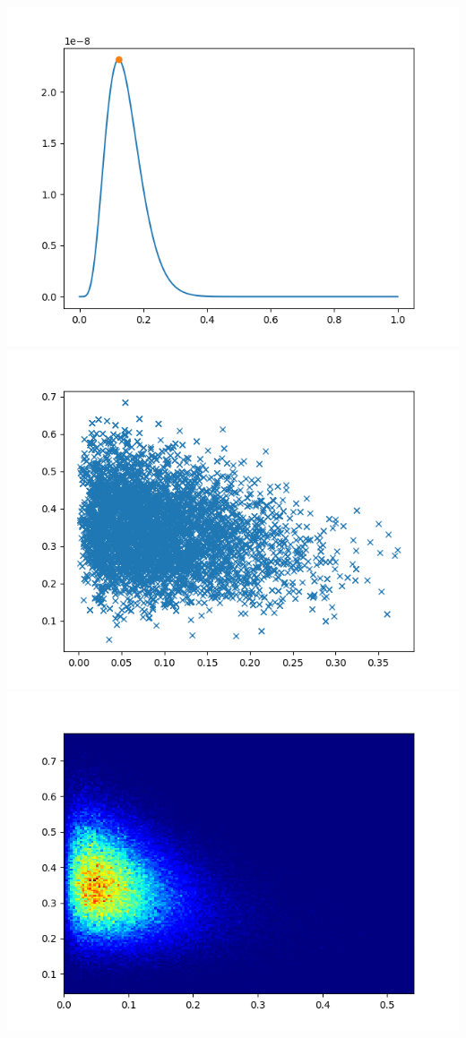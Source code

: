\documentclass[pt12]{article}
\begin{document}
\newpage

\begin{center}
\includegraphics[scale=0.5]{hip6.png}\\
\includegraphics[scale=0.5]{sc6.png}\\
\includegraphics[scale=0.5]{den6.png}\\
\end{center}
\end{document}
